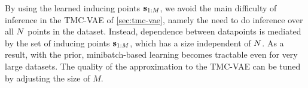%
%
%
By using the learned inducing points $\mathbf{s}_{1:M}$, we avoid the main difficulty of inference in the TMC-VAE of \autoref{sec:tmc-vae}, namely the need to do inference over all $N$ points in the dataset.
Instead, dependence between datapoints is mediated by the set of inducing points $\mathbf{s}_{1:M}$, which has a size independent of $N$.
As a result, with the \acronym\;prior, minibatch-based learning becomes tractable even for very large datasets.
The quality of the approximation to the TMC-VAE can be tuned by adjusting the size of $M$.

